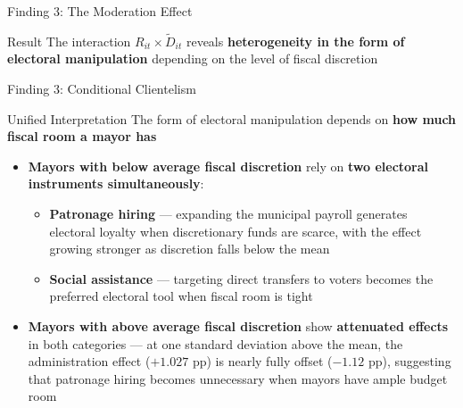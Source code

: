 \documentclass{beamer}
\begin{document}
\begin{frame}{Finding 3: The Moderation Effect}
\begin{block}{Result}
The interaction $R_{it} \times \tilde{D}_{it}$ reveals \textbf{heterogeneity in the form of electoral manipulation} depending on the level of fiscal discretion
\end{block}
\vspace{0.5em}
\begin{table}
\centering
{}
\end{table}
\end{frame}

\begin{frame}{Finding 3: Conditional Clientelism}
\begin{block}{Unified Interpretation}
The form of electoral manipulation depends on \textbf{how much fiscal room a mayor has}
\end{block}
\vspace{0.5em}
\begin{itemize}
    \item \textbf{Mayors with below average fiscal discretion} rely on \textbf{two electoral instruments simultaneously}:
    \begin{itemize}
        \item \textbf{Patronage hiring} --- expanding the municipal payroll generates electoral loyalty when discretionary funds are scarce, with the effect growing stronger as discretion falls below the mean
        \item \textbf{Social assistance} --- targeting direct transfers to voters becomes the preferred electoral tool when fiscal room is tight
    \end{itemize}
    \vspace{0.5em}
    \item \textbf{Mayors with above average fiscal discretion} show \textbf{attenuated effects} in both categories --- at one standard deviation above the mean, the administration effect ($+1.027$ pp) is nearly fully offset ($-1.12$ pp), suggesting that patronage hiring becomes unnecessary when mayors have ample budget room
\end{itemize}
\end{frame}
\end{document}

